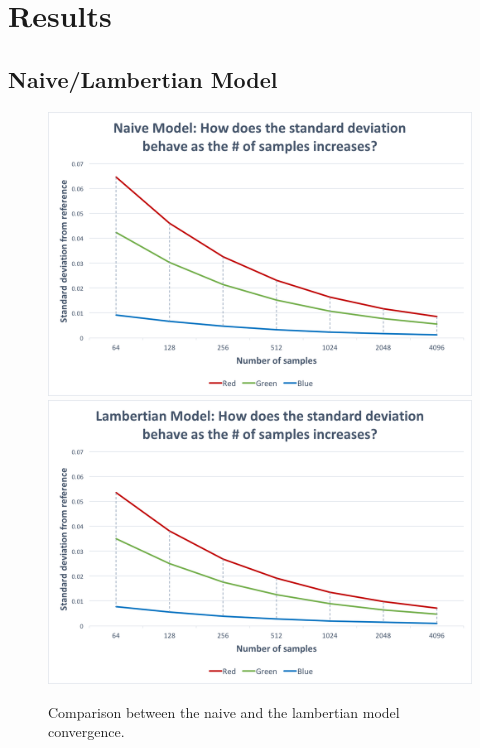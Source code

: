 \documentclass{article}
\begin{document}
\section*{Results}

\subsection*{Naive/Lambertian Model}

\begin{figure}[p]
\centering
\includegraphics[width=\textwidth]{assets/naive_stdev}
\\
\includegraphics[width=\textwidth]{assets/lamb_stdev}

\caption{Comparison between the naive and the lambertian model convergence.}
\end{figure}


\clearpage
\end{document}
